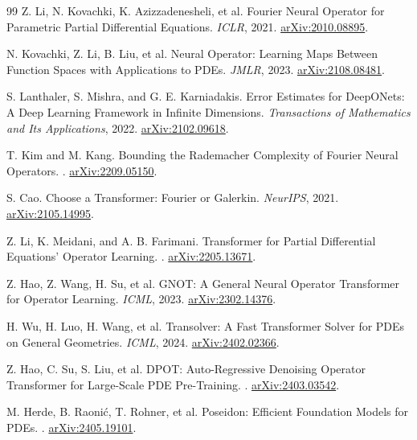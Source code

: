 \documentclass[11pt,a4paper]{article}
\begin{document}
\begin{thebibliography}{99}
Z. Li, N. Kovachki, K. Azizzadenesheli, et al.
\newblock Fourier Neural Operator for Parametric Partial Differential Equations.
\newblock \emph{ICLR}, 2021. \href{https://arxiv.org/abs/2010.08895}{arXiv:2010.08895}.

N. Kovachki, Z. Li, B. Liu, et al.
\newblock Neural Operator: Learning Maps Between Function Spaces with Applications to PDEs.
\newblock \emph{JMLR}, 2023. \href{https://arxiv.org/abs/2108.08481}{arXiv:2108.08481}.

S. Lanthaler, S. Mishra, and G. E. Karniadakis.
\newblock Error Estimates for DeepONets: A Deep Learning Framework in Infinite Dimensions.
\newblock \emph{Transactions of Mathematics and Its Applications}, 2022. \href{https://arxiv.org/abs/2102.09618}{arXiv:2102.09618}.

T. Kim and M. Kang.
\newblock Bounding the Rademacher Complexity of Fourier Neural Operators.
. \href{https://arxiv.org/abs/2209.05150}{arXiv:2209.05150}.

S. Cao.
\newblock Choose a Transformer: Fourier or Galerkin.
\newblock \emph{NeurIPS}, 2021. \href{https://arxiv.org/abs/2105.14995}{arXiv:2105.14995}.

Z. Li, K. Meidani, and A. B. Farimani.
\newblock Transformer for Partial Differential Equations' Operator Learning.
. \href{https://arxiv.org/abs/2205.13671}{arXiv:2205.13671}.

Z. Hao, Z. Wang, H. Su, et al.
\newblock GNOT: A General Neural Operator Transformer for Operator Learning.
\newblock \emph{ICML}, 2023. \href{https://arxiv.org/abs/2302.14376}{arXiv:2302.14376}.

H. Wu, H. Luo, H. Wang, et al.
\newblock Transolver: A Fast Transformer Solver for PDEs on General Geometries.
\newblock \emph{ICML}, 2024. \href{https://arxiv.org/abs/2402.02366}{arXiv:2402.02366}.

Z. Hao, C. Su, S. Liu, et al.
\newblock DPOT: Auto-Regressive Denoising Operator Transformer for Large-Scale PDE Pre-Training.
. \href{https://arxiv.org/abs/2403.03542}{arXiv:2403.03542}.

M. Herde, B. Raonić, T. Rohner, et al.
\newblock Poseidon: Efficient Foundation Models for PDEs.
. \href{https://arxiv.org/abs/2405.19101}{arXiv:2405.19101}.


\end{thebibliography}
\end{document}
